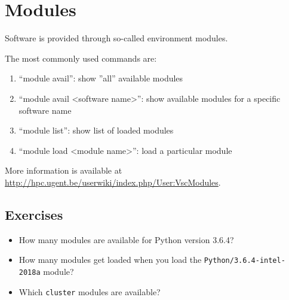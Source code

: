 \chapter{Modules}

Software is provided through so-called environment \gls{modules}.

The most commonly used commands are:

\begin{enumerate}
 \item ``module avail'': show ''all'' available modules
 \item ``module avail <software name>'': show available modules for a specific software name
 \item ``module list'': show list of loaded modules
 \item ``module load <module name>'': load a particular module
\end{enumerate}

More information is available at
\url{http://hpc.ugent.be/userwiki/index.php/User:VscModules}.

\section{Exercises}

\begin{itemize}
    \item How many modules are available for Python version 3.6.4?
    \item How many modules get loaded when you load the \verb|Python/3.6.4-intel-2018a|
        module?
    \item Which \verb|cluster| modules are available?
\end{itemize}
